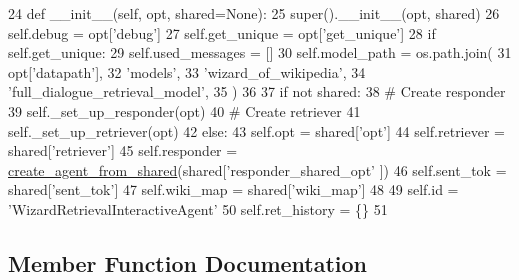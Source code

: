 \begin{DoxyCode}
24     \textcolor{keyword}{def }\_\_init\_\_(self, opt, shared=None):
25         super().\_\_init\_\_(opt, shared)
26         self.debug = opt[\textcolor{stringliteral}{'debug'}]
27         self.get\_unique = opt[\textcolor{stringliteral}{'get\_unique'}]
28         \textcolor{keywordflow}{if} self.get\_unique:
29             self.used\_messages = []
30         self.model\_path = os.path.join(
31             opt[\textcolor{stringliteral}{'datapath'}],
32             \textcolor{stringliteral}{'models'},
33             \textcolor{stringliteral}{'wizard\_of\_wikipedia'},
34             \textcolor{stringliteral}{'full\_dialogue\_retrieval\_model'},
35         )
36 
37         \textcolor{keywordflow}{if} \textcolor{keywordflow}{not} shared:
38             \textcolor{comment}{# Create responder}
39             self.\_set\_up\_responder(opt)
40             \textcolor{comment}{# Create retriever}
41             self.\_set\_up\_retriever(opt)
42         \textcolor{keywordflow}{else}:
43             self.opt = shared[\textcolor{stringliteral}{'opt'}]
44             self.retriever = shared[\textcolor{stringliteral}{'retriever'}]
45             self.responder = \hyperlink{namespaceparlai_1_1core_1_1agents_aa5af5dd1d2f9da491b60348d479b849f}{create\_agent\_from\_shared}(shared[\textcolor{stringliteral}{'responder\_shared\_opt'}
      ])
46             self.sent\_tok = shared[\textcolor{stringliteral}{'sent\_tok'}]
47             self.wiki\_map = shared[\textcolor{stringliteral}{'wiki\_map'}]
48 
49         self.id = \textcolor{stringliteral}{'WizardRetrievalInteractiveAgent'}
50         self.ret\_history = \{\}
51 
\end{DoxyCode}


\subsection{Member Function Documentation}
\mbox{\label{classprojects_1_1wizard__of__wikipedia_1_1interactive__retrieval_1_1interactive__retrieval_1_1InteractiveRetrievalAgent_a637d3bd64317b3ba691ab6eac90b4788}} 
